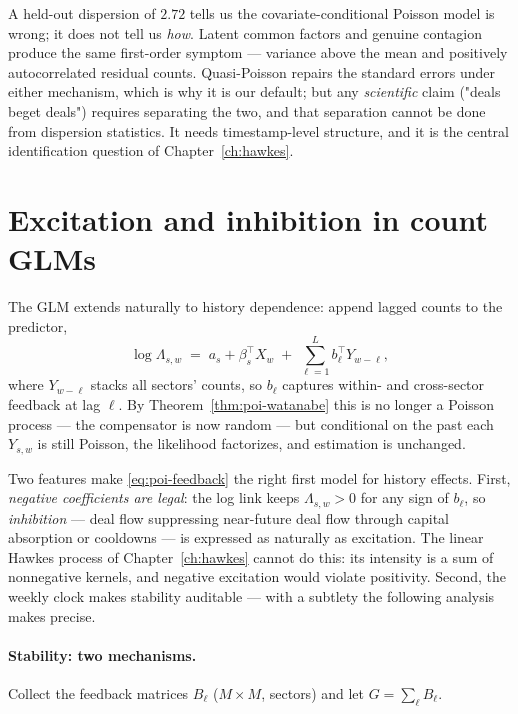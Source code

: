 \begin{warning}
\label{warn:poi-dispersion}
A held-out dispersion of $2.72$ tells us the covariate-conditional Poisson model is wrong;
it does not tell us \emph{how}. Latent common factors and genuine contagion produce the
same first-order symptom --- variance above the mean and positively autocorrelated
residual counts. Quasi-Poisson repairs the standard errors under either mechanism, which
is why it is our default; but any \emph{scientific} claim ("deals beget deals") requires
separating the two, and that separation cannot be done from dispersion statistics. It
needs timestamp-level structure, and it is the central identification question of
Chapter~\ref{ch:hawkes}.
\end{warning}

\section{Excitation and inhibition in count GLMs}
\label{sec:poi-feedback}

The GLM extends naturally to history dependence: append lagged counts to the predictor,
\begin{equation}
\log \Lambda_{s,w} \;=\; a_s + \beta_s^{\top} X_w
\;+\; \sum_{\ell=1}^{L} b_{\ell}^{\top} Y_{w-\ell},
\label{eq:poi-feedback}
\end{equation}
where $Y_{w-\ell}$ stacks all sectors' counts, so $b_{\ell}$ captures within- and
cross-sector feedback at lag $\ell$. By Theorem~\ref{thm:poi-watanabe} this is no longer a
Poisson process --- the compensator is now random --- but conditional on the past each
$Y_{s,w}$ is still Poisson, the likelihood factorizes, and estimation is unchanged.

Two features make \eqref{eq:poi-feedback} the right first model for history effects.
First, \emph{negative coefficients are legal}: the log link keeps $\Lambda_{s,w} > 0$ for
any sign of $b_{\ell}$, so \emph{inhibition} --- deal flow suppressing near-future deal
flow through capital absorption or cooldowns --- is expressed as naturally as excitation.
The linear Hawkes process of Chapter~\ref{ch:hawkes} cannot do this: its intensity is a
sum of nonnegative kernels, and negative excitation would violate positivity. Second, the
weekly clock makes stability auditable --- with a subtlety the following analysis makes
precise.

\paragraph{Stability: two mechanisms.}
Collect the feedback matrices $B_{\ell}$ ($M \times M$, sectors) and let
$G = \sum_{\ell} B_{\ell}$.

